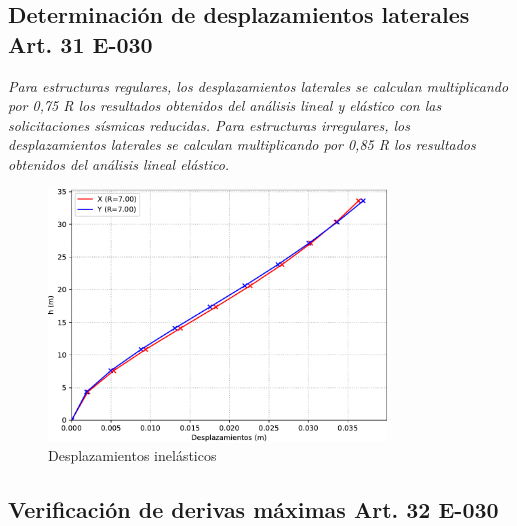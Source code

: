 \documentclass{article}%
\begin{document}
\subsection{Determinación de desplazamientos laterales Art. 31 E{-}030}%
\label{subsec:DeterminacindedesplazamientoslateralesArt.31E{-}030}%
\begin{tcolorbox}[colback=gray!5!white,colframe=Maroon!75!black,fonttitle=\bfseries,title=Art. 31.3.1]%
\textit{Para  estructuras  regulares, los  desplazamientos  laterales  se  calculan multiplicando por 0,75 R los resultados obtenidos del análisis lineal y elástico con las solicitaciones sísmicas reducidas. Para estructuras irregulares, los desplazamientos laterales se calculan multiplicando por 0,85 R los resultados obtenidos del análisis lineal elástico.}%
\end{tcolorbox}%


\begin{figure}[H]%
\includegraphics[width=0.8\textwidth]{images/desplazamientos_laterales}%
\caption{Desplazamientos inelásticos}%
\end{figure}

%
\subsection{Verificación de derivas máximas Art. 32 E{-}030}%
\label{subsec:VerificacindederivasmximasArt.32E{-}030}%
\end{document}
